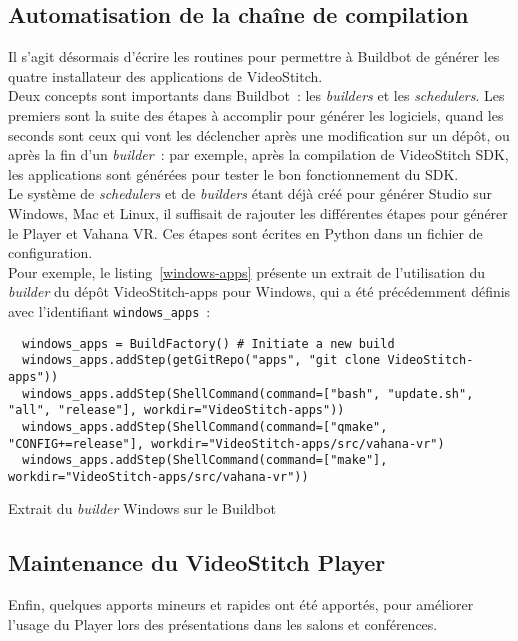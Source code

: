 \subsection{Automatisation de la chaîne de compilation}
Il s'agit désormais d'écrire les routines pour permettre à Buildbot de générer
les quatre installateur des applications de VideoStitch.\\
Deux concepts sont importants dans Buildbot~: les \textit{builders} et les \textit{schedulers}.
Les premiers sont la suite des étapes à accomplir pour générer les logiciels, quand
les seconds sont ceux qui vont les déclencher après une modification
sur un dépôt, ou après la fin d'un \textit{builder}~: par exemple, après la compilation de
VideoStitch SDK, les applications sont générées pour tester le bon fonctionnement
du SDK.\\
Le système de \textit{schedulers} et de \textit{builders} étant déjà créé pour 
générer Studio sur Windows, Mac et Linux, il suffisait de rajouter les différentes 
étapes pour générer le Player et Vahana VR. Ces étapes sont écrites en Python dans un fichier de configuration.
\ \\
\newline
Pour exemple, le listing~\ref{windows-apps} présente un extrait de l'utilisation 
du \textit{builder} du dépôt VideoStitch-apps pour Windows, qui a été précédemment 
définis avec l'identifiant \texttt{windows_apps}~:
\begin{listing}
  \begin{verbatim}
  windows_apps = BuildFactory() # Initiate a new build
  windows_apps.addStep(getGitRepo("apps", "git clone VideoStitch-apps"))
  windows_apps.addStep(ShellCommand(command=["bash", "update.sh", "all", "release"], workdir="VideoStitch-apps"))
  windows_apps.addStep(ShellCommand(command=["qmake", "CONFIG+=release"], workdir="VideoStitch-apps/src/vahana-vr")
  windows_apps.addStep(ShellCommand(command=["make"], workdir="VideoStitch-apps/src/vahana-vr"))
  \end{verbatim}
  \caption{Extrait du \textit{builder} Windows sur le Buildbot}
  \label{windows-apps}
\end{listing}

\subsection{Maintenance du VideoStitch Player}
Enfin, quelques apports mineurs et rapides ont été apportés, pour améliorer l'usage
du Player lors des présentations dans les salons et conférences.

